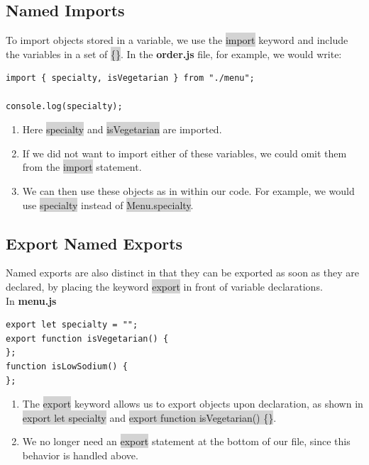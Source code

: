 \documentclass[11pt]{article}
\begin{document}
\subsection{Named Imports}
To import objects stored in a variable, we use the \colorbox{lightgray}{import} keyword and include the variables in a set of \colorbox{lightgray}{\{\}}. In the \textbf{order.js} file, for example, we would write:
\begin{lstlisting}
import { specialty, isVegetarian } from "./menu";

console.log(specialty);
\end{lstlisting}
\begin{enumerate}[leftmargin = *]
\item Here \colorbox{lightgray}{specialty} and \colorbox{lightgray}{isVegetarian} are imported.
\item If we did not want to import either of these variables, we could omit them from the \colorbox{lightgray}{import} statement.
\item We can then use these objects as in within our code. For example, we would use \colorbox{lightgray}{specialty} instead of \colorbox{lightgray}{Menu.specialty}.
\end{enumerate}

\subsection{Export Named Exports}
Named exports are also distinct in that they can be exported as soon as they are declared, by placing the keyword \colorbox{lightgray}{export} in front of variable declarations. \\
\newline
In \textbf{menu.js}
\begin{lstlisting}
export let specialty = "";
export function isVegetarian() {
}; 
function isLowSodium() {
}; 
\end{lstlisting}
\begin{enumerate}[leftmargin = *]
\item The \colorbox{lightgray}{export} keyword allows us to export objects upon declaration, as shown in \colorbox{lightgray}{export let specialty} and \colorbox{lightgray}{export function isVegetarian() \{\}}.
\item We no longer need an \colorbox{lightgray}{export} statement at the bottom of our file, since this behavior is handled above.
\end{enumerate}
\end{document}
